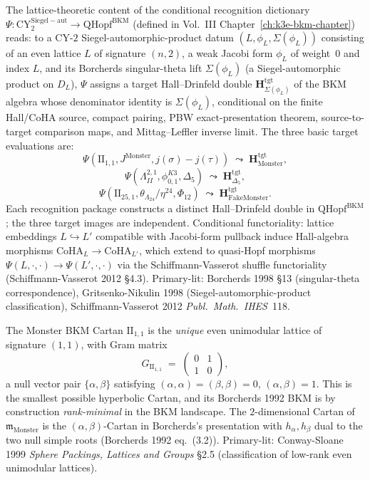 \begin{remark}
\label{rem:latfnd-w17-universal-Psi}
The lattice-theoretic content of the conditional recognition dictionary
$\Psi: \mathrm{CY}^{\mathrm{Siegel-aut}}_2 \to \mathrm{QHopf}^{\mathrm{BKM}}$
(defined in Vol.~III Chapter~\ref{ch:k3e-bkm-chapter}) reads: to a
CY-$2$ Siegel-automorphic-product datum $(L,\phi_L,\Sigma(\phi_L))$
consisting of an even lattice $L$ of signature $(n,2)$, a weak
Jacobi form $\phi_L$ of weight~$0$ and index $L$, and its Borcherds
singular-theta lift $\Sigma(\phi_L)$ (a Siegel-automorphic product
on $D_L$), $\Psi$ assigns a target Hall--Drinfeld double
$\mathbf H_{\Sigma(\phi_L)}^{\mathrm{tgt}}$ of the BKM algebra whose
denominator identity is $\Sigma(\phi_L)$, conditional on the finite
Hall/CoHA source, compact pairing, PBW exact-presentation theorem,
source-to-target comparison maps, and Mittag--Leffler inverse limit.
The three basic target evaluations are:
\[
 \Psi(\mathrm{II}_{1,1}, J^{\mathrm{Monster}}, j(\sigma)-j(\tau))
 \;\leadsto\; \mathbf H_{\mathrm{Monster}}^{\mathrm{tgt}},
\]
\[
 \Psi(\Lambda^{2,1}_{II}, \phi_{0,1}^{K3}, \Delta_5)
 \;\leadsto\; \mathbf H_{\Delta_5}^{\mathrm{tgt}},
\]
\[
 \Psi(\mathrm{II}_{25,1}, \theta_{\Lambda_{24}}/\eta^{24}, \Phi_{12})
 \;\leadsto\; \mathbf H_{\mathrm{FakeMonster}}^{\mathrm{tgt}}.
\]
Each recognition package constructs a distinct Hall--Drinfeld double
in $\mathrm{QHopf}^{\mathrm{BKM}}$; the three target images are
independent. Conditional functoriality:
lattice embeddings $L\hookrightarrow L'$ compatible with Jacobi-form
pullback induce Hall-algebra morphisms
$\mathrm{CoHA}_L\to\mathrm{CoHA}_{L'}$, which extend to
quasi-Hopf morphisms $\Psi(L,\cdot,\cdot)\to\Psi(L',\cdot,\cdot)$
via the Schiffmann-Vasserot shuffle functoriality
(Schiffmann-Vasserot 2012 \S4.3). Primary-lit: Borcherds 1998
\S13 (singular-theta correspondence), Gritsenko-Nikulin 1998
(Siegel-automorphic-product classification), Schiffmann-Vasserot
2012 \emph{Publ.\ Math.\ IHES}~118.
\end{remark}

\begin{remark}
\label{rem:latfnd-w17-II-1-1}
The Monster BKM Cartan $\mathrm{II}_{1,1}$ is the \emph{unique} even
unimodular lattice of signature $(1,1)$, with Gram matrix
\[
 G_{\mathrm{II}_{1,1}}
 \;=\;
 \begin{pmatrix} 0 & 1 \\ 1 & 0 \end{pmatrix},
\]
a null vector pair $\{\alpha,\beta\}$ satisfying
$(\alpha,\alpha)=(\beta,\beta)=0$, $(\alpha,\beta)=1$. This is the
smallest possible hyperbolic Cartan, and its Borcherds 1992 BKM
is by construction \emph{rank-minimal} in the BKM landscape.
The $2$-dimensional Cartan of $\mathfrak m_{\mathrm{Monster}}$ is
the $(\alpha,\beta)$-Cartan in Borcherds's presentation with
$h_\alpha, h_\beta$ dual to the two null simple roots
(Borcherds 1992 eq.~(3.2)). Primary-lit: Conway-Sloane 1999
\emph{Sphere Packings, Lattices and Groups} \S2.5 (classification
of low-rank even unimodular lattices).
\end{remark}

